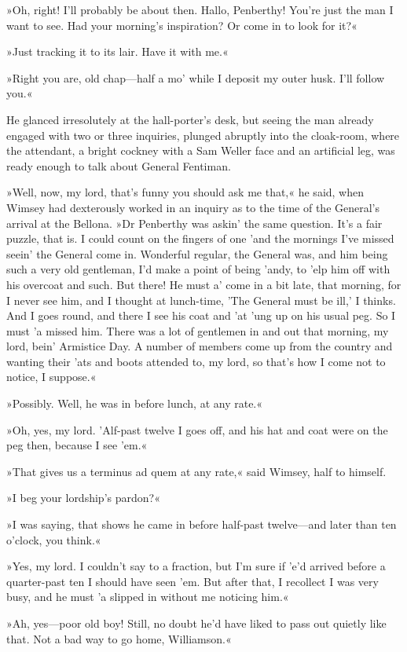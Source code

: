 »Oh, right! I'll probably be about then. Hallo, Penberthy! You're just the man I want to see. Had your morning's inspiration? Or come in to look for it?«

»Just tracking it to its lair. Have it with me.«

»Right you are, old chap—half a mo' while I deposit my outer husk. I'll follow you.«

He glanced irresolutely at the hall-porter's desk, but seeing the man already engaged with two or three inquiries, plunged abruptly into the cloak-room, where the attendant, a bright cockney with a Sam Weller face and an artificial leg, was ready enough to talk about General Fentiman.

»Well, now, my lord, that's funny you should ask me that,« he said, when Wimsey had dexterously worked in an inquiry as to the time of the General's arrival at the Bellona. »Dr Penberthy was askin' the same question. It's a fair puzzle, that is. I could count on the fingers of one 'and the mornings I've missed seein' the General come in. Wonderful regular, the General was, and him being such a very old gentleman, I'd make a point of being 'andy, to 'elp him off with his overcoat and such. But there! He must a' come in a bit late, that morning, for I never see him, and I thought at lunch-time, 'The General must be ill,' I thinks. And I goes round, and there I see his coat and 'at 'ung up on his usual peg. So I must 'a missed him. There was a lot of gentlemen in and out that morning, my lord, bein' Armistice Day. A number of members come up from the country and wanting their 'ats and boots attended to, my lord, so that's how I come not to notice, I suppose.«

»Possibly. Well, he was in before lunch, at any rate.«

»Oh, yes, my lord. 'Alf-past twelve I goes off, and his hat and coat were on the peg then, because I see 'em.«

»That gives us a terminus ad quem at any rate,« said Wimsey, half to himself.

»I beg your lordship's pardon?«

»I was saying, that shows he came in before half-past twelve—and later than ten o'clock, you think.«

»Yes, my lord. I couldn't say to a fraction, but I'm sure if 'e'd arrived before a quarter-past ten I should have seen 'em. But after that, I recollect I was very busy, and he must 'a slipped in without me noticing him.«

»Ah, yes—poor old boy! Still, no doubt he'd have liked to pass out quietly like that. Not a bad way to go home, Williamson.«

